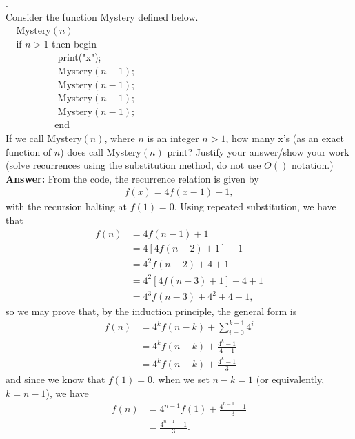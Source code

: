 \documentclass[a4paper,11pt]{article}
\begin{document}
.\\
Consider the function Mystery defined below.\\
\noindent
$~~~~~$Mystery$(n)$\\
$~~~~~$if $n > 1$ then
 begin\\
$~~~~~~~~~~~~~~~~~~~~~~~$ print("x");\\
$~~~~~~~~~~~~~~~~~~~~~~~$ Mystery$(n-1);$  \\
$~~~~~~~~~~~~~~~~~~~~~~~$ Mystery$(n-1); $ \\ 
$~~~~~~~~~~~~~~~~~~~~~~~$ Mystery$(n-1);$  \\
$~~~~~~~~~~~~~~~~~~~~~~~$ Mystery$(n-1); $ \\ 
$~~~~~~~~~~~~~~~~~~~~~~~$end\\
If we call Mystery$(n)$, where $n$ is an integer $n>1$, how many x's (as an exact function of $n$)
does call Mystery$(n)$ print?
Justify your answer/show your work 
(solve recurrences using the substitution method, do not use $O()$ notation.)\\
{\bf Answer:}
From the code, the recurrence relation is given by
\begin{align*}
    f(x) = 4f(x - 1) + 1,
\end{align*}
with the recursion halting at $f(1) = 0$. Using repeated substitution, we have that
\begin{align*}
    f(n) &= 4f(n - 1) + 1 \\
    &= 4[4f(n - 2) + 1] + 1 \\
    &= 4^2f(n - 2) + 4 + 1 \\
    &= 4^2[4f(n - 3) + 1] + 4 + 1 \\
    &= 4^3f(n - 3) + 4^2 + 4 + 1,
\end{align*}
so we may prove that, by the induction principle, the general form is
\begin{align*}
    f(n) &= 4^kf(n - k) + \sum_{i = 0}^{k - 1} 4^i \\
    &= 4^kf(n - k) + \frac{4^k - 1}{4 - 1} \\
    &= 4^kf(n - k) + \frac{4^k - 1}{3}
\end{align*}
and since we know that $f(1) = 0$, when we set $n - k = 1$ (or equivalently, $k = n - 1$), we have
\begin{align*}
    f(n) &= 4^{n - 1} f(1) + \frac{4^{n - 1} - 1}{3} \\
    &= \frac{4^{n - 1} - 1}{3}.
\end{align*}
\end{document}
